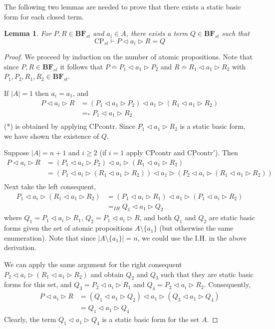 \documentclass[a4paper,twoside,openright]{report}
\newcommand{\BF}{\ensuremath{\textbf{BF}}}
\newcommand{\syn}{\bumpeq}
\newcommand{\CPcontr}{\ensuremath{\mathrm{CPcontr}}}
\newcommand{\lef}{\ensuremath{\triangleleft}}
\newcommand{\rig}{\ensuremath{\triangleright}}
\newtheorem{lem}[theorem]{Lemma}
\begin{document}
The following two lemmas are needed to prove that there exists a static basic form for each closed term.
\begin{lem}\label{red lemma}
For $P,R\in\BF_{st}$ and $a_i\in A$, there exists a term $Q\in\BF_{st}$ such that
\[
\text{CP}_{st}\vdash P\lef a_i\rig R=Q
\]
\end{lem}
\begin{proof}
We proceed by induction on the number of atomic propositions. Note that since $P,R\in\BF_{st}$ it follows that $P\syn P_1\lef a_1\rig P_2$ and $R\syn R_1\lef a_1\rig R_2$ with $P_1,P_2,R_1,R_2\in\BF_{st}$.

If $|A|=1$ then $a_i=a_1$, and
\begin{align*}
P\lef a_i\rig R
&=(P_1\lef a_1\rig P_2)\lef a_1\rig(R_1\lef a_1\rig R_2)\\
&=_*P_1\lef a_1\rig R_2\\
\end{align*}
(*) is obtained by applying \CPcontr. Since $P_1\lef a_1\rig R_2$ is a static basic form, we have shown the existence of $Q$.

Suppose $|A|=n+1$ and $i\ge 2$ (if $i=1$ apply $\CPcontr$ and $\CPcontr'$). Then
\begin{align*}
P\lef a_i\rig R
&=(P_1\lef a_1\rig P_2)\lef a_i\rig(R_1\lef a_1\rig R_2)\\
&=(P_1\lef a_i\rig(R_1\lef a_1\rig R_2))\lef a_1\rig(P_2\lef a_i\rig(R_1\lef a_1\rig R_2))\\
\end{align*}
Next take the left consequent,
\begin{align*}
P_1\lef a_i\rig(R_1\lef a_1\rig R_2)
&=(P_1\lef a_i\rig R_1)\lef a_1\rig(P_1\lef a_i\rig R_2)\\
&=_{IH}Q_1\lef a_1\rig Q_2
\end{align*}
where $Q_1=P_1\lef a_i\rig R_1$, $Q_2=P_1\lef a_i\rig R$, and both $Q_1$ and $Q_2$ are static basic forms given the set of atomic propositions $A\setminus\{a_1\}$ (but otherwise the same enumeration). Note that since $|A\setminus\{a_1\}|=n$, we could use the I.H. in the above derivation. 

We can apply the same argument for the right consequent $P_2\lef a_i\rig(R_1\lef a_1\rig R_2)$ and obtain $Q_2$ and $Q_3$ such that they are static basic forms for this set, and $Q_3=P_2\lef a_i\rig R_1$ and $Q_4=P_2\lef a_i\rig R_2$. Consequently,
\begin{align*}
P\lef a_i\rig R
&=(Q_1\lef a_1\rig Q_2)\lef a_1\rig(Q_3\lef a_1\rig Q_4)\\
&=Q_1\lef a_1\rig Q_4
\end{align*}
Clearly, the term $Q_1\lef a_1\rig Q_4$ is a static basic form for the set $A$.
\end{proof}
\end{document}
